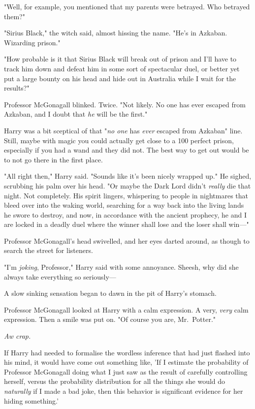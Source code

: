"Well, for example, you mentioned that my parents were betrayed. Who betrayed 
them?"

"Sirius Black," the witch said, almost hissing the name. "He's in Azkaban. 
Wizarding prison."

"How probable is it that Sirius Black will break out of prison and I'll have to 
track him down and defeat him in some sort of spectacular duel, or better yet 
put a large bounty on his head and hide out in Australia while I wait for the 
results?"

Professor McGonagall blinked. Twice. "Not likely. No one has ever escaped from 
Azkaban, and I doubt that \emph{he} will be the first."

Harry was a bit sceptical of that "\emph{no one} has \emph{ever} escaped from 
Azkaban" line. Still, maybe with magic you could actually get close to a 100%
perfect prison, especially if you had a wand and they did not. The best way to 
get out would be to not go there in the first place.

"All right then," Harry said. "Sounds like it's been nicely wrapped up." He 
sighed, scrubbing his palm over his head. "Or maybe the Dark Lord didn't 
\emph{really} die that night. Not completely. His spirit lingers, whispering to 
people in nightmares that bleed over into the waking world, searching for a way 
back into the living lands he swore to destroy, and now, in accordance with the 
ancient prophecy, he and I are locked in a deadly duel where the winner shall 
lose and the loser shall win---"

Professor McGonagall's head swivelled, and her eyes darted around, as though to 
search the street for listeners.

"I'm \emph{joking}, Professor," Harry said with some annoyance. Sheesh, why did 
she always take everything so seriously---

A slow sinking sensation began to dawn in the pit of Harry's stomach.

Professor McGonagall looked at Harry with a calm expression. A very, 
\emph{very} calm expression. Then a smile was put on. "Of course you are, 
Mr.~Potter."

\emph{Aw crap.}

If Harry had needed to formalise the wordless inference that had just flashed 
into his mind, it would have come out something like, 'If I estimate the 
probability of Professor McGonagall doing what I just saw as the result of 
carefully controlling herself, versus the probability distribution for all the 
things she would do \emph{naturally} if I made a bad joke, then this behavior 
is significant evidence for her hiding something.'

